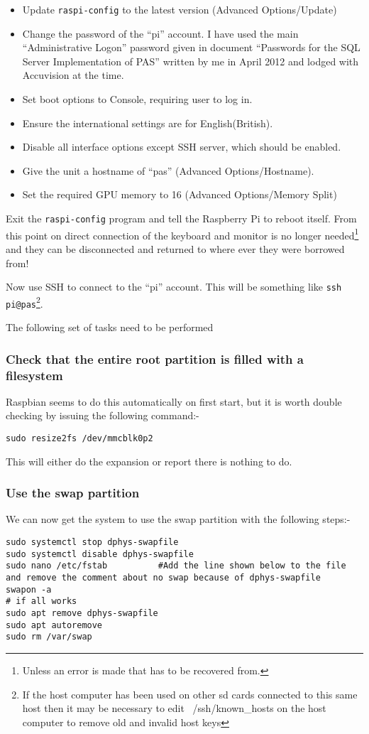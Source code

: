 \documentclass[Draft]{akc}
\begin{document}
\begin{itemize}
\item Update \texttt{raspi-config} to the latest version (Advanced Options/Update)
\item Change the password of the ``pi'' account. I have used the main
``Administrative Logon'' password given in document ``Passwords for the SQL Server Implementation of
PAS'' written by me in April 2012 and lodged with Accuvision at the time.
\item Set boot options to Console, requiring user to log in.
\item Ensure the international settings are for English(British).
\item Disable all interface options except SSH server, which should be enabled.
\item Give the unit a hostname of ``pas'' (Advanced Options/Hostname).
\item Set the required GPU memory to 16  (Advanced Options/Memory Split)
\end{itemize}

Exit the \texttt{raspi-config} program and tell the Raspberry Pi to reboot itself.  From this point
on direct connection of the keyboard and monitor is no longer needed\footnote{Unless an error is
made that has to be recovered from.} and they can be disconnected and returned to where ever they
were borrowed from!

Now use SSH to connect to the ``pi'' account.  This will be something like \texttt{ssh pi@pas}\footnote{If
the host computer has been used on other sd cards connected to this same host then it may be necessary to
edit ~/ssh/known\_hosts on the host computer to remove old and invalid host keys}.

The following set of tasks need to be performed

\subsubsection{Check that the entire root partition is filled with a filesystem}

Raspbian seems to do this automatically on first start, but it is worth double checking by
issuing the following command:-

\begin{lstlisting}
sudo resize2fs /dev/mmcblk0p2
\end{lstlisting}

This will either do the expansion or report there is nothing to do.
\subsubsection{Use the swap partition}
We can now get the system to use the swap partition with the following steps:-
\begin{lstlisting}
sudo systemctl stop dphys-swapfile
sudo systemctl disable dphys-swapfile
sudo nano /etc/fstab          #Add the line shown below to the file and remove the comment about no swap because of dphys-swapfile
swapon -a
# if all works
sudo apt remove dphys-swapfile
sudo apt autoremove
sudo rm /var/swap
\end{lstlisting}
\end{document}
